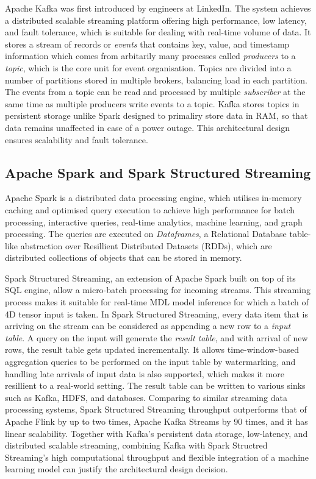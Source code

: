 \documentclass[11pt]{uonthesis}
\begin{document}
Apache Kafka\cite{Kreps2011KafkaA} was first introduced by engineers at LinkedIn. The system achieves a distributed scalable streaming platform offering high performance, low latency, and fault tolerance, which is suitable for dealing with real-time volume of data. It stores a stream of records or \textit{events} that contains key, value, and timestamp information which comes from arbitarily many processes called \textit{producers} to a \textit{topic}, which is the core unit for event organisation. Topics are divided into a number of partitions stored in multiple brokers, balancing load in each partition. The events from a topic can be read and processed by multiple \textit{subscriber} at the same time as multiple producers write events to a topic. Kafka stores topics in persistent storage unlike Spark designed to primaliry store data in RAM, so that data remains unaffected in case of a power outage. This architectural design ensures scalability and fault tolerance. 

\subsection{Apache Spark and Spark Structured Streaming}

Apache Spark is a distributed data processing engine, which utilises in-memory caching and optimised query execution to achieve high performance for batch processing, interactive queries, real-time analytics, machine learning, and graph processing. The queries are executed on \textit{Dataframes}, a Relational Database table-like abstraction over Resillient Distributed Datasets (RDDs), which are distributed collections of objects that can be stored in memory.

Spark Structured Streaming\cite{10.1145/3183713.3190664}, an extension of Apache Spark built on top of its SQL engine, allow a micro-batch processing for incoming streams. This streaming process makes it suitable for real-time MDL model inference for which a batch of 4D tensor input is taken. In Spark Structured Streaming, every data item that is arriving on the stream can be considered as appending a new row to a \textit{input table}. A query on the input will generate the \textit{result table}, and with arrival of new rows, the result table gets updated incrementally. It allows time-window-based aggregation queries to be performed on the input table by watermarking, and handling late arrivals of input data is also supported, which makes it more resillient to a real-world setting. The result table can be written to various sinks such as Kafka, HDFS, and databases. Comparing to similar streaming data processing systems, Spark Structured Streaming throughput outperforms that of Apache Flink by up to two times, Apache Kafka Streams by 90 times, and it has linear scalability. Together with Kafka's persistent data storage, low-latency, and distributed scalable streaming, combining Kafka with Spark Structred Streaming's high computational throughput and flexible integration of a machine learning model can justify the architectural design decision. %
\end{document}

